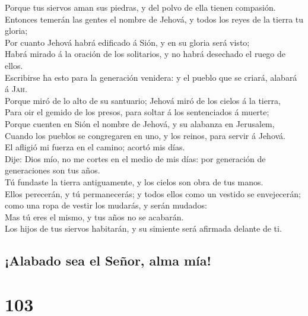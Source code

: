  Porque tus siervos aman sus piedras, y del polvo de ella
tienen compasión.\\
 Entonces temerán las gentes el nombre de Jehová, y todos
los reyes de la tierra tu gloria;\\
 Por cuanto Jehová habrá edificado á Sión, y en su gloria
será visto;\\
 Habrá mirado á la oración de los solitarios, y no habrá
desechado el ruego de ellos.\\
 Escribirse ha esto para la generación venidera: y el
pueblo que se criará, alabará á \textsc{Jah}.\\
 Porque miró de lo alto de su santuario; Jehová miró de
los cielos á la tierra,\\
 Para oir el gemido de los presos, para soltar á los
sentenciados á muerte;\\
 Porque cuenten en Sión el nombre de Jehová, y su
alabanza en Jerusalem,\\
 Cuando los pueblos se congregaren en uno, y los reinos,
para servir á Jehová.\\
 El afligió mi fuerza en el camino; acortó mis días.\\
 Dije: Dios mío, no me cortes en el medio de mis días:
por generación de generaciones son tus años.\\
 Tú fundaste la tierra antiguamente, y los cielos son
obra de tus manos.\\
 Ellos perecerán, y tú permanecerás; y todos ellos como
un vestido se envejecerán; como una ropa de vestir los mudarás, y serán
mudados:\\
 Mas tú eres el mismo, y tus años no se acabarán.\\
 Los hijos de tus siervos habitarán, y su simiente será
afirmada delante de ti.

\hypertarget{alabado-sea-el-seuxf1or-alma-muxeda}{%
\subsection{¡Alabado sea el Señor, alma
mía!}\label{alabado-sea-el-seuxf1or-alma-muxeda}}

\hypertarget{section-102}{%
\section{103}\label{section-102}}

